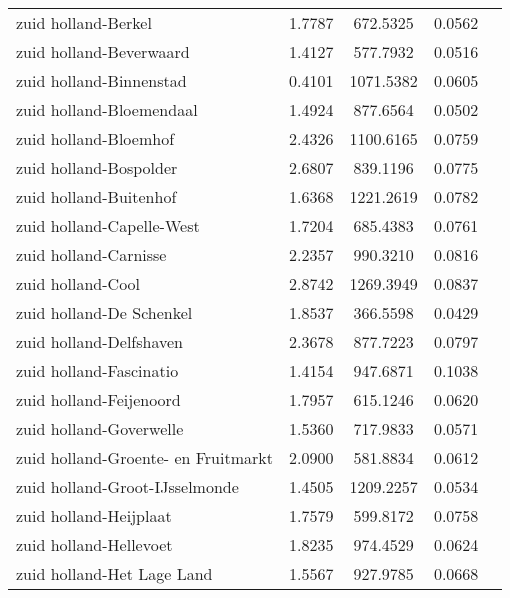 \begin{longtable}{llccc}
	zuid holland-Berkel                       & 1.7787  & 672.5325  & 0.0562                 \\
	zuid holland-Beverwaard                   & 1.4127  & 577.7932  & 0.0516                 \\
	zuid holland-Binnenstad                   & 0.4101  & 1071.5382 & 0.0605                 \\
	zuid holland-Bloemendaal                  & 1.4924  & 877.6564  & 0.0502                 \\
	zuid holland-Bloemhof                     & 2.4326  & 1100.6165 & 0.0759                 \\
	zuid holland-Bospolder                    & 2.6807  & 839.1196  & 0.0775                 \\
	zuid holland-Buitenhof                    & 1.6368  & 1221.2619 & 0.0782                 \\
	zuid holland-Capelle-West                 & 1.7204  & 685.4383  & 0.0761                 \\
	zuid holland-Carnisse                     & 2.2357  & 990.3210  & 0.0816                 \\
	zuid holland-Cool                         & 2.8742  & 1269.3949 & 0.0837                 \\
	zuid holland-De Schenkel                  & 1.8537  & 366.5598  & 0.0429                 \\
	zuid holland-Delfshaven                   & 2.3678  & 877.7223  & 0.0797                 \\
	zuid holland-Fascinatio                   & 1.4154  & 947.6871  & 0.1038                 \\
	zuid holland-Feijenoord                   & 1.7957  & 615.1246  & 0.0620                 \\
	zuid holland-Goverwelle                   & 1.5360  & 717.9833  & 0.0571                 \\
	zuid holland-Groente- en Fruitmarkt       & 2.0900  & 581.8834  & 0.0612                 \\
	zuid holland-Groot-IJsselmonde            & 1.4505  & 1209.2257 & 0.0534                 \\
	zuid holland-Heijplaat                    & 1.7579  & 599.8172  & 0.0758                 \\
	zuid holland-Hellevoet                    & 1.8235  & 974.4529  & 0.0624                 \\
	zuid holland-Het Lage Land                & 1.5567  & 927.9785  & 0.0668                 \\

\end{longtable}
